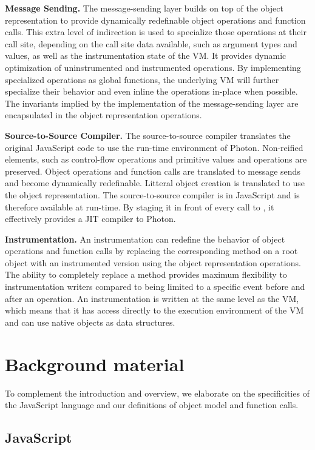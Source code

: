\textbf{Message Sending.} The message-sending layer builds on top of the object
representation to provide dynamically redefinable object operations and
function calls. This extra level of indirection is used to specialize those
operations at their call site, depending on the call site data available, such
as argument types and values, as well as the instrumentation state of the VM.
It provides dynamic optimization of uninstrumented and instrumented operations.
By implementing specialized operations as global functions, the underlying VM
will further specialize their behavior and even inline the operations in-place
when possible. The invariants implied by the implementation of the
message-sending layer are encapsulated in the object representation operations.

\textbf{Source-to-Source Compiler.} The source-to-source compiler translates
the original JavaScript code to use the run-time environment of Photon.
Non-reified elements, such as control-flow operations and primitive values and
operations are preserved.  Object operations and function calls are translated
to message sends and become dynamically redefinable. Litteral object creation
is translated to use the object representation. The source-to-source compiler
is in JavaScript and is therefore available at run-time. By staging it in front
of every call to , it effectively provides a JIT compiler to Photon.

\textbf{Instrumentation.} An instrumentation can redefine the behavior
of object operations and function calls by replacing the corresponding method
on a root object with an instrumented version using the object representation
operations. The ability to completely replace a method provides maximum
flexibility to instrumentation writers compared to being limited to a specific
event before and after an operation. An instrumentation is written at the same
level as the VM, which means that it has access directly to the execution
environment of the VM and can use native objects as data structures.

\section{Background material}

To complement the introduction and overview, we elaborate on the specificities
of the JavaScript language and our definitions of object model and function
calls.

\subsection{JavaScript}


